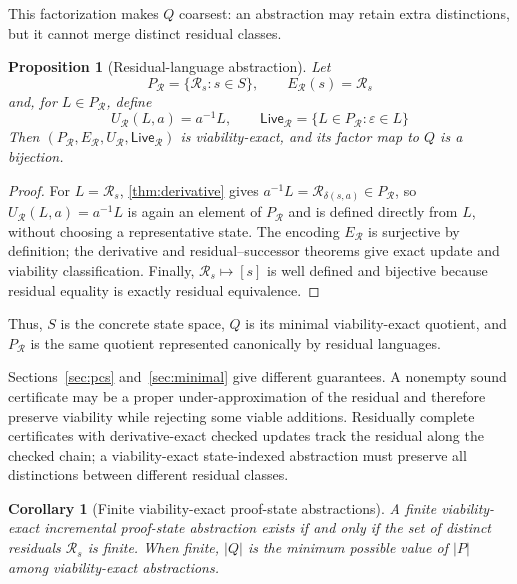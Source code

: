 \documentclass[11pt]{article}
\newtheorem{proposition}[proposition]{Proposition}
\newtheorem{corollary}[corollary]{Corollary}
\theoremstyle{definition}
\newcommand{\States}{S}
\newcommand{\Residual}{\mathcal R}
\newcommand{\ProofStates}{P}
\newcommand{\Live}{\mathsf{Live}}
\newcommand{\Encode}{E}
\newcommand{\Update}{U}
\newcommand{\eps}{\varepsilon}
\begin{document}
This factorization makes $Q$ coarsest: an abstraction may retain extra distinctions, but it cannot merge distinct residual classes.

\begin{proposition}[Residual-language abstraction]\label{prop:canonical-abstraction}
Let
\[
  P_{\Residual}=\{\Residual_s:s\in\States\},
  \qquad
  \Encode_{\Residual}(s)=\Residual_s
\]
and, for $L\in P_{\Residual}$, define
\[
  \Update_{\Residual}(L,a)=a^{-1}L,
  \qquad
  \Live_{\Residual}=\{L\in P_{\Residual}:\eps\in L\}
\]
Then $(P_{\Residual},\Encode_{\Residual},\Update_{\Residual},\Live_{\Residual})$ is viability-exact, and its factor map to $Q$ is a bijection.
\end{proposition}

\begin{proof}
For $L=\Residual_s$, \cref{thm:derivative} gives
$a^{-1}L=\Residual_{\delta(s,a)}\in P_{\Residual}$, so
$\Update_{\Residual}(L,a)=a^{-1}L$ is again an element of $P_{\Residual}$ and is defined directly
from $L$, without choosing a representative state. The encoding
$\Encode_{\Residual}$ is surjective by definition; the derivative and
residual--successor theorems give exact update and viability classification.
Finally, $\Residual_s\mapsto[s]$ is well defined and bijective because
residual equality is exactly residual equivalence.
\end{proof}

Thus, $S$ is the concrete state space, $Q$ is its minimal viability-exact quotient, and $P_{\Residual}$ is the same quotient represented canonically by residual languages.

Sections~\ref{sec:pcs} and~\ref{sec:minimal} give different guarantees. A nonempty sound certificate may be a proper under-approximation of the residual and therefore preserve viability while rejecting some viable additions. Residually complete certificates with derivative-exact checked updates track the residual along the checked chain; a viability-exact state-indexed abstraction must preserve all distinctions between different residual classes.

\begin{corollary}[Finite viability-exact proof-state abstractions]\label{cor:finite-state}
A finite viability-exact incremental proof-state abstraction exists if and only if the set of distinct residuals $\Residual_s$ is finite. When finite, $|Q|$ is the minimum possible value of $|\ProofStates|$ among viability-exact abstractions.
\end{corollary}
\end{document}
